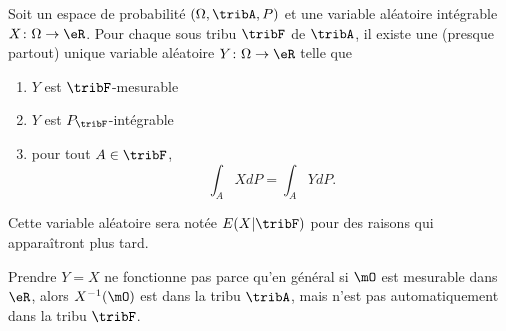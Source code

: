 \begin{theorem}     \label{ThoMWfDPQ}
    Soit un espace de probabilité \( (\Omega,\tribA,P)\) et une variable aléatoire intégrable \( X\colon \Omega\to \eR\). Pour chaque sous tribu \( \tribF\) de \( \tribA\), il existe une (presque partout) unique variable aléatoire \( Y\colon \Omega\to \eR\) telle que
    \begin{enumerate}
        \item
            \( Y\) est \( \tribF\)-mesurable
        \item
            \( Y\) est \( P_{\tribF}\)-intégrable
        \item
            pour tout \( A\in\tribF\),
            \begin{equation}
                \int_{A}XdP=\int_A YdP.
            \end{equation}
    \end{enumerate}
    Cette variable aléatoire sera notée \( E(X|\tribF)\) pour des raisons qui apparaîtront plus tard.
\end{theorem}

\begin{remark}
    Prendre \( Y=X\) ne fonctionne pas parce qu'en général si \( \mO\) est mesurable dans \( \eR\), alors \( X^{-1}(\mO)\) est dans la tribu \( \tribA\), mais n'est pas automatiquement dans la tribu \( \tribF\).
\end{remark}

